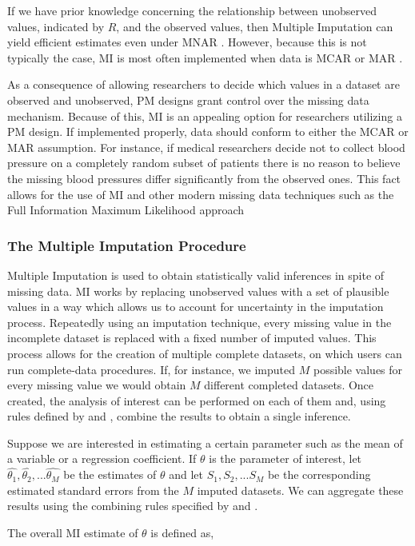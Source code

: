 \documentclass{svjour3}                     %
\begin{document}
If we have prior knowledge concerning the relationship between unobserved values, indicated by $R$, and the observed values, then Multiple Imputation can yield efficient estimates even under MNAR \citep{harel2007multiple}. However, because this is not typically the case, MI is most often implemented when data is MCAR or MAR \citep{little2014statistical}. \par 
As a consequence of allowing researchers to decide which values in a dataset are observed and unobserved, PM designs grant control over the missing data mechanism. Because of this, MI is an appealing option for researchers utilizing a PM design. If implemented properly, data should conform to either the MCAR or MAR assumption. For instance, if medical researchers decide not to collect blood pressure on a completely random subset of patients there is no reason to believe the missing blood pressures differ significantly from the observed ones. This fact allows for the use of MI and other modern missing data techniques such as the Full Information Maximum Likelihood approach \citep{dempster1977maximum} \par

\subsubsection{The Multiple Imputation Procedure}
\label{sec:1.3.2}
Multiple Imputation is used to obtain statistically valid inferences in spite of missing data. MI works by replacing unobserved values with a set of plausible values in a way which allows us to account for uncertainty in the imputation process. Repeatedly using an imputation technique, every missing value in the incomplete dataset is replaced with a fixed number of imputed values. This process allows for the creation of multiple complete datasets, on which users can run complete-data procedures. If, for instance, we imputed $M$ possible values for every missing value we would obtain $M$ different completed datasets. Once created, the analysis of interest can be performed on each of them and, using rules defined by \citet{little2014statistical} and \citet{rubin2004multiple}, combine the results to obtain a single inference. \par

Suppose we are interested in estimating a certain parameter such as the mean of a variable or a regression coefficient. If $\theta$ is the parameter of interest, let $\widehat{\theta_1}, \widehat{\theta_2}, ... \widehat{\theta_M}$ be the estimates of $\theta$ and let $S_1, S_2, ... S_M$ be the corresponding estimated standard errors from the $M$ imputed datasets. We can aggregate these results using the combining rules specified by \citet{little2014statistical} and \citet{rubin2004multiple}. \par
The overall MI estimate of $\theta$ is defined as,
\end{document}
